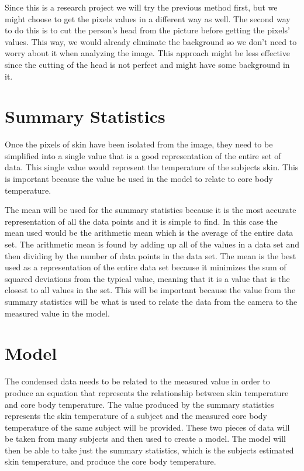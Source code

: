 ﻿\documentclass[onecolumn, draftclsnofoot,10pt, compsoc]{IEEEtran}
\begin{document}
Since this is a research project we will try the previous method first, but we might choose to get the pixels values in a different way as well. The second way to do this is to cut the person’s head from the picture before getting the pixels’ values. This way, we would already eliminate the background so we don’t need to worry about it when analyzing the image. This approach might be less effective since the cutting of the head is not perfect and might have some background in it. 


\section{Summary Statistics}

Once the pixels of skin have been isolated from the image, they need to be simplified into a single value that is a good representation of the entire set of data. This single value would represent the temperature of the subjects skin. This is important because the value be used in the model to relate to core body temperature. 

The mean will be used for the summary statistics because it is the most accurate representation of all the data points and it is simple to find. In this case the mean used would be the arithmetic mean which is the average of the entire data set. The arithmetic mean is found by adding up all of the values in a data set and then dividing by the number of data points in the data set. The mean is the best used as a representation of the entire data set because it minimizes the sum of squared deviations from the typical value, meaning that it is a value that is the closest to all values in the set. This will be important because the value from the summary statistics will be what is used to relate the data from the camera to the measured value in the model.

\section{Model}

The condensed data needs to be related to the measured value in order to produce an equation that represents the relationship between skin temperature and core body temperature. The value produced by the summary statistics represents the skin temperature of a subject and the measured core body temperature of the same subject will be provided. These two pieces of data will be taken from many subjects and then used to create a model. The model will then be able to take just the summary statistics, which is the subjects estimated skin temperature, and produce the core body temperature.
\end{document}
